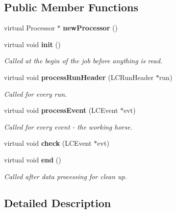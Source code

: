 \subsection*{Public Member Functions}
\begin{DoxyCompactItemize}
\item 
virtual Processor $\ast$ {\bfseries new\-Processor} ()\label{classSDHCAL__RawData__Processor_a2858a41a6e319c7421ae5a7c4bb72ce8}

\item 
virtual void {\bf init} ()
\begin{DoxyCompactList}\small\item\em Called at the begin of the job before anything is read. \end{DoxyCompactList}\item 
virtual void {\bf process\-Run\-Header} (L\-C\-Run\-Header $\ast$run)\label{classSDHCAL__RawData__Processor_a5055e1d2a481b4521389857b8e635e47}

\begin{DoxyCompactList}\small\item\em Called for every run. \end{DoxyCompactList}\item 
virtual void {\bf process\-Event} (L\-C\-Event $\ast$evt)\label{classSDHCAL__RawData__Processor_a206997e22828eff5fcb029448533e3b4}

\begin{DoxyCompactList}\small\item\em Called for every event -\/ the working horse. \end{DoxyCompactList}\item 
virtual void {\bfseries check} (L\-C\-Event $\ast$evt)\label{classSDHCAL__RawData__Processor_ab884e4f49c7cf3b10e9a68cf977cd7b3}

\item 
virtual void {\bf end} ()\label{classSDHCAL__RawData__Processor_a5ce1f6c5628449ad3ea9e4aeb0f8457b}

\begin{DoxyCompactList}\small\item\em Called after data processing for clean up. \end{DoxyCompactList}\end{DoxyCompactItemize}


\subsection{Detailed Description}


